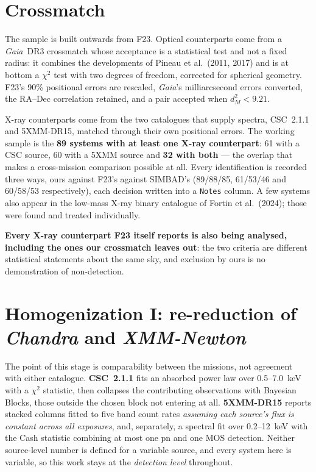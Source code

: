 \documentclass[10pt,a4paper]{article}
\begin{document}
\section{Crossmatch}

The sample is built outwards from F23. Optical counterparts come from a
\textit{Gaia}~DR3 crossmatch whose acceptance is a statistical test and not a
fixed radius: it combines the developments of Pineau et al.\ (2011, 2017) and is
at bottom a $\chi^{2}$ test with two degrees of freedom, corrected for spherical
geometry. F23's 90\% positional errors are rescaled, \textit{Gaia}'s
milliarcsecond errors converted, the RA--Dec correlation retained, and a pair
accepted when $d_{M}^{2}<9.21$.

X-ray counterparts come from the two catalogues that supply spectra, CSC~2.1.1
and 5XMM-DR15, matched through their own positional errors. The working sample
is the \textbf{89 systems with at least one X-ray counterpart}:
61 with a CSC source, 60 with a 5XMM source and \textbf{32 with both} --- the
overlap that makes a cross-mission comparison possible at all. Every identification is recorded three ways, ours against F23's against SIMBAD's
(89/88/85, 61/53/46 and 60/58/53 respectively), each decision written into a
\texttt{Notes} column. A few systems also appear in the low-mass
X-ray binary catalogue of Fortin et al.\ (2024); those were found and treated
individually.

\textbf{Every X-ray counterpart F23 itself reports is also being analysed,
including the ones our crossmatch leaves out}: the two criteria are different
statistical statements about the same sky, and exclusion by ours is no
demonstration of non-detection.

\section{Homogenization I: re-reduction of \textit{Chandra} and \textit{XMM-Newton}}

The point of this stage is comparability between the missions, not agreement
with either catalogue. \textbf{CSC~2.1.1} fits an absorbed power law over
0.5--7.0~keV with a $\chi^{2}$ statistic, then collapses the contributing
observations with Bayesian Blocks, those outside the chosen block not entering
at all. \textbf{5XMM-DR15} reports
stacked columns fitted to five band count rates \emph{assuming each source's
flux is constant across all exposures}, and, separately, a spectral fit over
0.2--12~keV with the Cash statistic combining at most one pn and one MOS
detection. Neither source-level number is defined for a variable source, and
every system here is variable, so this work stays at the \emph{detection level}
throughout.
\end{document}
